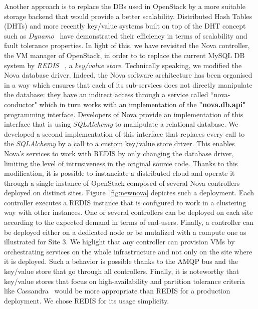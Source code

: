 Another approach is to replace the DBs used in OpenStack by a more suitable storage
backend that would provide a better scalability. Distributed Hash Tables (DHTs) and more
recently key/value systems built on top of the DHT concept such as
\emph{Dynamo}~\cite{decandia:dynamo} have demonstrated their efficiency in terms of
scalability and fault tolerance properties.
%
In light of this, we have revisited the Nova controller, \ie the VM manager of OpenStack,
in order to to replace the current MySQL DB system by \textit{REDIS} ~\cite{han:2011},
a \textit{key/value store}.
Technically speaking, we modified the Nova database driver. Indeed, the  Nova software architecture has been
organised in a way which ensures that each of its sub-services does not directly manipulate the database: they have an indirect
access through a service called ``nova-conductor" which in turn works with an
implementation of the \textbf{"nova.db.api"} programming interface. Developers of Nova
provide an implementation of this interface that is using \textit{SQLAlchemy} to
manipulate a relational database. We developed a second implementation of this interface
that replaces every call to the \textit{SQLAlchemy} by a call to a
custom key/value store
driver.  This enables  Nova's services to work with REDIS by only changing the
database driver, limiting the level of intrusiveness in the original source code.
Thanks to this modification, it is possible to instanciate  a distributed
cloud and operate it through a single instance of OpenStack composed
of several Nova controllers deployed on distinct sites.
Figure~\ref{fig:newnova} depictes such a deployment.
%
Each controller executes a REDIS instance that is configured to work in
a clustering way with other instances.
One or several controllers can be deployed on each site according to
the expected demand in terms of end-users. Finally, a controller can be
deployed either on a dedicated node or be mutalized with a compute
one as illustrated for Site 3. We higlight that any controller can
provision VMs by orchestrating services on the whole infrastructure and not only on the site
where it is deployed. Such a behavior is possible thanks to the AMQP
bus and the key/value store that go through all controllers.
%
Finally, it is noteworthy that key/value stores that
focus on high-availability and partition tolerance criteria like
Cassandra~\cite{lakshman:2010} would be more appropriate than REDIS
for a production deployment. We chose REDIS for its usage simplicity.

